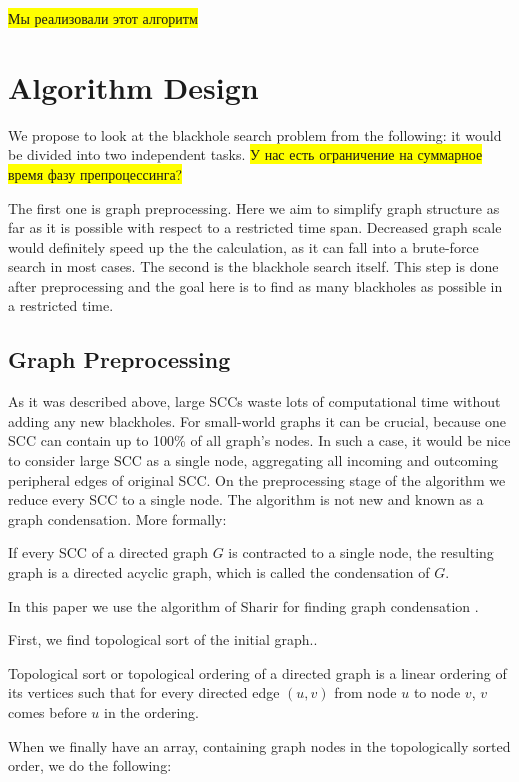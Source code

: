 \documentclass{svproc}
\newcommand{\FIXME}[1]{ %
	\colorbox{yellow}{#1}
}
\newcommand{\FIXME}[1]{ %
}
\begin{document}
\FIXME{Мы реализовали этот алгоритм}

\section{Algorithm Design}
We propose to look at the blackhole search problem from the following: it would be divided into two independent tasks. 
\FIXME{У нас есть ограничение на суммарное время фазу препроцессинга?}
The first one is graph preprocessing. Here we aim to simplify graph structure as far as it is possible with respect to a restricted time span. 
Decreased graph scale would definitely speed up the the calculation, as it can fall into a brute-force search in most cases.
The second is the blackhole search itself. This step is done after preprocessing and the goal here is to find as many blackholes as possible in a restricted time.

%
\subsection{Graph Preprocessing}
As it was described above, large SCCs waste lots of computational time without adding any new blackholes. 
For small-world graphs it can be crucial, because one SCC can contain up to 100\% of all graph's nodes. 
In such a case, it would be nice to consider large SCC as a single node, aggregating all incoming and outcoming peripheral edges
of original SCC.
On the preprocessing stage of the algorithm we reduce every SCC to a single node. The algorithm is not new and known as a graph condensation.
More formally:

\begin{definition}
If every SCC of a directed graph $G$ is contracted to a single node, the resulting graph is a directed acyclic graph, which is called the condensation of $G$.
\end{definition}

In this paper we use the algorithm of Sharir for finding graph condensation \cite{sharir1981strong}. 

First, we find topological sort of the initial graph..

\begin{definition}
Topological sort or topological ordering of a directed graph is a linear ordering of 
its vertices such that for every directed edge $(u,v)$ from node $u$ to node $v$,
$v$ comes before $u$ in the ordering.
\end{definition}

When we finally have an array, containing graph nodes in the topologically sorted order, we do the following:
\end{document}
